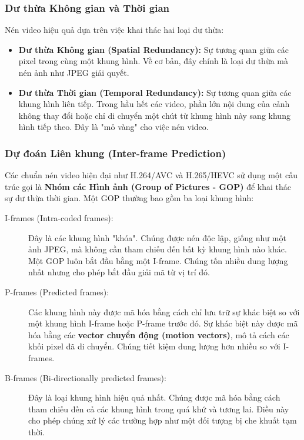 \subsubsection{Dư thừa Không gian và Thời gian}
Nén video hiệu quả dựa trên việc khai thác hai loại dư thừa:
\begin{itemize}
    \item \textbf{Dư thừa Không gian (Spatial Redundancy):} Sự tương quan giữa các pixel trong cùng một khung hình. Về cơ bản, đây chính là loại dư thừa mà nén ảnh như JPEG giải quyết.
    \item \textbf{Dư thừa Thời gian (Temporal Redundancy):} Sự tương quan giữa các khung hình liên tiếp. Trong hầu hết các video, phần lớn nội dung của cảnh không thay đổi hoặc chỉ di chuyển một chút từ khung hình này sang khung hình tiếp theo. Đây là "mỏ vàng" cho việc nén video.
\end{itemize}

\subsubsection{Dự đoán Liên khung (Inter-frame Prediction)}
Các chuẩn nén video hiện đại như H.264/AVC và H.265/HEVC sử dụng một cấu trúc gọi là \textbf{Nhóm các Hình ảnh (Group of Pictures - GOP)} để khai thác sự dư thừa thời gian. Một GOP thường bao gồm ba loại khung hình:

\begin{description}
    \item[I-frames (Intra-coded frames):] Đây là các khung hình "khóa". Chúng được nén độc lập, giống như một ảnh JPEG, mà không cần tham chiếu đến bất kỳ khung hình nào khác. Một GOP luôn bắt đầu bằng một I-frame. Chúng tốn nhiều dung lượng nhất nhưng cho phép bắt đầu giải mã từ vị trí đó.
    \item[P-frames (Predicted frames):] Các khung hình này được mã hóa bằng cách chỉ lưu trữ sự khác biệt so với một khung hình I-frame hoặc P-frame trước đó. Sự khác biệt này được mã hóa bằng các \textbf{vector chuyển động (motion vectors)}, mô tả cách các khối pixel đã di chuyển. Chúng tiết kiệm dung lượng hơn nhiều so với I-frames.
    \item[B-frames (Bi-directionally predicted frames):] Đây là loại khung hình hiệu quả nhất. Chúng được mã hóa bằng cách tham chiếu đến cả các khung hình trong quá khứ và tương lai. Điều này cho phép chúng xử lý các trường hợp như một đối tượng bị che khuất tạm thời.
\end{description}

